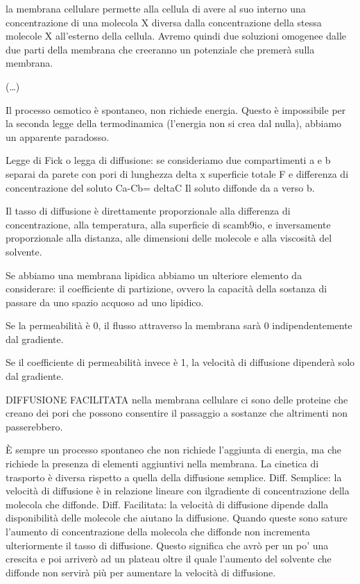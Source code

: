 \documentclass[]{article}
\begin{document}
la membrana cellulare permette alla cellula di avere al suo interno una
concentrazione di una molecola X diversa dalla concentrazione della
stessa molecole X all'esterno della cellula. Avremo quindi due soluzioni
omogenee dalle due parti della membrana che creeranno un potenziale che
premerà sulla membrana.

(\ldots{})

Il processo osmotico è spontaneo, non richiede energia. Questo è
impossibile per la seconda legge della termodinamica (l'energia non si
crea dal nulla), abbiamo un apparente paradosso.

Legge di Fick o legga di diffusione: se consideriamo due compartimenti a
e b separai da parete con pori di lunghezza delta x superficie totale F
e differenza di concentrazione del soluto Ca-Cb= deltaC Il soluto
diffonde da a verso b.

Il tasso di diffusione è direttamente proporzionale alla differenza di
concentrazione, alla temperatura, alla superficie di scamb9io, e
inversamente proporzionale alla distanza, alle dimensioni delle molecole
e alla viscosità del solvente.

Se abbiamo una membrana lipidica abbiamo un ulteriore elemento da
considerare: il coefficiente di partizione, ovvero la capacità della
sostanza di passare da uno spazio acquoso ad uno lipidico.

Se la permeabilità è 0, il flusso attraverso la membrana sarà 0
indipendentemente dal gradiente.

Se il coefficiente di permeabilità invece è 1, la velocità di diffusione
dipenderà solo dal gradiente.

DIFFUSIONE FACILITATA nella membrana cellulare ci sono delle proteine
che creano dei pori che possono consentire il passaggio a sostanze che
altrimenti non passerebbero.

È sempre un processo spontaneo che non richiede l'aggiunta di energia,
ma che richiede la presenza di elementi aggiuntivi nella membrana. La
cinetica di trasporto è diversa rispetto a quella della diffusione
semplice. Diff. Semplice: la velocità di diffusione è in relazione
lineare con ilgradiente di concentrazione della molecola che diffonde.
Diff. Facilitata: la velocità di diffusione dipende dalla disponibilità
delle molecole che aiutano la diffusione. Quando queste sono sature
l'aumento di concentrazione della molecola che diffonde non incrementa
ulteriormente il tasso di diffusione. Questo significa che avrò per un
po' una crescita e poi arriverò ad un plateau oltre il quale l'aumento
del solvente che diffonde non servirà più per aumentare la velocità di
diffusione.
\end{document}
